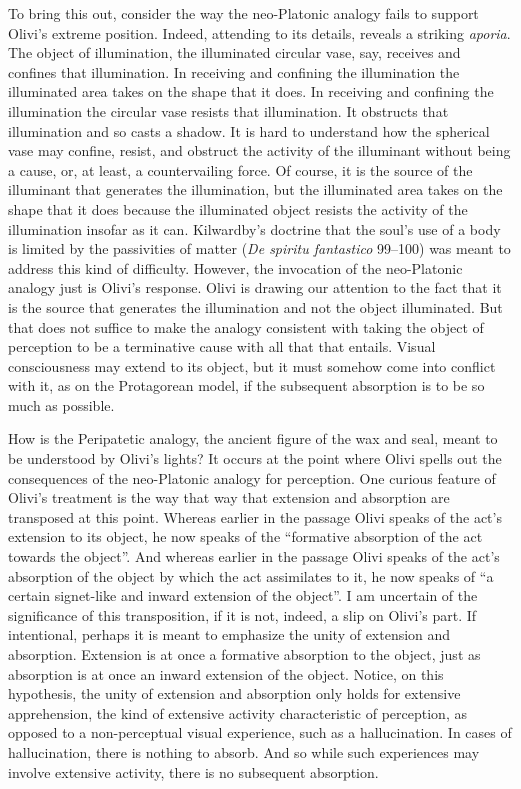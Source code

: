 To bring this out, consider the way the neo-Platonic analogy fails to support Olivi's extreme position. Indeed, attending to its details, reveals a striking \emph{aporia}. The object of illumination, the illuminated circular vase, say, receives and confines that illumination. In receiving and confining the illumination the illuminated area takes on the shape that it does. In receiving and confining the illumination the circular vase resists that illumination. It obstructs that illumination and so casts a shadow. It is hard to understand how the spherical vase may confine, resist, and obstruct the activity of the illuminant without being a cause, or, at least, a countervailing force. Of course, it is the source of the illuminant that generates the illumination, but the illuminated area takes on the shape that it does because the illuminated object resists the activity of the illumination insofar as it can. Kilwardby's doctrine that the soul's use of a body is limited by the passivities of matter (\emph{De spiritu fantastico} 99–100) was meant to address this kind of difficulty. However, the invocation of the neo-Platonic analogy just is Olivi's response. Olivi is drawing our attention to the fact that it is the source that generates the illumination and not the object illuminated. But that does not suffice to make the analogy consistent with taking the object of perception to be a terminative cause with all that that entails. Visual consciousness may extend to its object, but it must somehow come into conflict with it, as on the Protagorean model, if the subsequent absorption is to be so much as possible. 

How is the Peripatetic analogy, the ancient figure of the wax and seal, meant to be understood by Olivi's lights? It occurs at the point where Olivi spells out the consequences of the neo-Platonic analogy for perception. One curious feature of Olivi's treatment is the way that way that extension and absorption are transposed at this point. Whereas earlier in the passage Olivi speaks of the act's extension to its object, he now speaks of the ``formative absorption of the act towards the object''. And whereas earlier in the passage Olivi speaks of the act's absorption of the object by which the act assimilates to it, he now speaks of ``a certain signet-like and inward extension of the object''. I am uncertain of the significance of this transposition, if it is not, indeed, a slip on Olivi's part. If intentional, perhaps it is meant to emphasize the unity of extension and absorption. Extension is at once a formative absorption to the object, just as absorption is at once an inward extension of the object. Notice, on this hypothesis, the unity of extension and absorption only holds for extensive apprehension, the kind of extensive activity characteristic of perception, as opposed to a non-perceptual visual experience, such as a hallucination. In cases of hallucination, there is nothing to absorb. And so while such experiences may involve extensive activity, there is no subsequent absorption.

